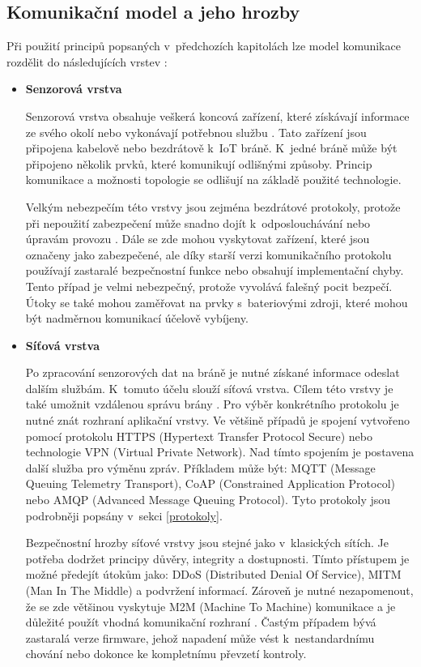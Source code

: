  \subsection{Komunikační model a jeho hrozby}
 Při použití principů popsaných v~předchozích kapitolách lze model komunikace rozdělit
 do následujících vrstev \cite{iotSurvey}:
 \begin{itemize}

 \item \textbf{Senzorová vrstva}
 
 Senzorová vrstva obsahuje veškerá koncová zařízení, které získávají informace ze svého
 okolí nebo vykonávají potřebnou službu \cite{secFramework}. Tato zařízení jsou připojena
 kabelově nebo bezdrátově k~IoT bráně. K~jedné bráně může být připojeno několik
 prvků, které komunikují odlišnými způsoby. Princip komunikace a možnosti topologie se odlišují
 na základě použité technologie.
 
 Velkým nebezpečím této vrstvy jsou zejména bezdrátové protokoly, protože při nepoužití
 zabezpečení může snadno dojít k~odposlouchávání nebo úpravám provozu \cite{iotSurvey}.
 Dále se zde mohou vyskytovat zařízení, které jsou označeny jako zabezpečené, 
 ale díky starší verzi komunikačního protokolu používají zastaralé bezpečnostní funkce
 nebo obsahují implementační chyby. 
 Tento případ je velmi nebezpečný, protože vyvolává falešný pocit bezpečí. Útoky se také mohou 
 zaměřovat na prvky s~bateriovými zdroji, které mohou být nadměrnou komunikací
 účelově vybíjeny.
 
 \item \textbf{Síťová vrstva}
 
  Po zpracování senzorových dat na bráně je nutné získané informace odeslat dalším
 službám. K~tomuto účelu slouží síťová vrstva. Cílem této vrstvy je také umožnit 
 vzdálenou správu brány \cite{secFramework}. Pro výběr konkrétního protokolu je 
 nutné znát rozhraní aplikační vrstvy. Ve většině případů je  spojení vytvořeno
 pomocí protokolu HTTPS (Hypertext Transfer Protocol Secure) nebo technologie
 VPN (Virtual Private Network). Nad tímto spojením je postavena další služba pro 
 výměnu zpráv. Příkladem může být: MQTT (Message Queuing Telemetry Transport),
 CoAP (Constrained Application Protocol) nebo
 AMQP (Advanced Message Queuing Protocol). Tyto protokoly jsou podrobněji popsány
v~sekci \ref{protokoly}.
 
 Bezpečnostní hrozby síťové vrstvy jsou stejné jako v~klasických sítích. Je potřeba
 dodržet principy důvěry, integrity a dostupnosti. Tímto přístupem je možné
 předejít útokům jako: DDoS (Distributed Denial Of Service),
 MITM (Man In The Middle) a podvržení informací. Zároveň je nutné
 nezapomenout, že se zde většinou vyskytuje M2M (Machine To Machine)
 komunikace a je důležité použít 
 vhodná komunikační rozhraní \cite{iotSurvey}. Častým případem bývá zastaralá 
 verze firmware, jehož napadení může vést k~nestandardnímu chování nebo dokonce 
 ke kompletnímu převzetí kontroly. 
 

\end{itemize}
